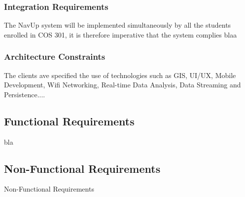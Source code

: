 \documentclass[12pt,a4paper]{report}
\begin{document}
			\subsubsection{Integration Requirements}
				The NavUp system will be implemented simultaneously by all the students enrolled in COS 301, it is therefore imperative that the system complies blaa %
			\subsubsection{Architecture Constraints}
				The clients ave specified the use of technologies such as GIS, UI/UX, Mobile Development, Wifi Networking, Real-time Data Analysis, Data Streaming and
				Persistence....
		
	\subsection*{Functional Requirements}
		bla
		
	\subsection*{Non-Functional Requirements}
		Non-Functional Requirements
\end{document}
